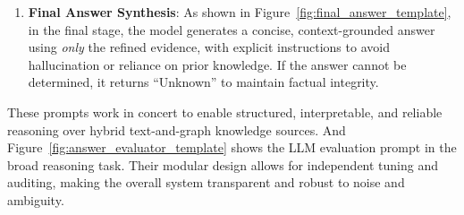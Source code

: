 \begin{enumerate}
\item \textbf{Final Answer Synthesis}: As shown in Figure~\ref{fig:final_answer_template}, in the final stage, the model generates a concise, context-grounded answer using \textit{only} the refined evidence, with explicit instructions to avoid hallucination or reliance on prior knowledge. If the answer cannot be determined, it returns ``Unknown'' to maintain factual integrity.
\end{enumerate}

These prompts work in concert to enable structured, interpretable, and reliable reasoning over hybrid text-and-graph knowledge sources. 
And Figure~\ref{fig:answer_evaluator_template} shows the LLM evaluation prompt in the broad reasoning task.
Their modular design allows for independent tuning and auditing, making the overall system transparent and robust to noise and ambiguity.


